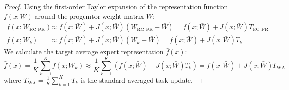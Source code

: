 \documentclass{article}
\theoremstyle{plain}
\theoremstyle{definition}
\theoremstyle{remark}
\begin{document}
\begin{proof}
Using the first-order Taylor expansion of the representation function $f(x; W)$ around the progenitor weight matrix $\bar{W}$:
\begin{align}
    f(x; W_{\text{RG-PR}}) &\approx f(x; \bar{W}) + J(x; \bar{W}) (W_{\text{RG-PR}} - \bar{W}) = f(x; \bar{W}) + J(x; \bar{W}) T_{\text{RG-PR}} \\
    f(x; W_k) &\approx f(x; \bar{W}) + J(x; \bar{W}) (W_k - \bar{W}) = f(x; \bar{W}) + J(x; \bar{W}) T_k
\end{align}
We calculate the target average expert representation $\bar{f}(x)$:
\begin{equation}
    \bar{f}(x) = \frac{1}{K} \sum_{k=1}^K f(x; W_k) \approx \frac{1}{K} \sum_{k=1}^K \left( f(x; \bar{W}) + J(x; \bar{W}) T_k \right) = f(x; \bar{W}) + J(x; \bar{W}) T_{\text{WA}}
\end{equation}
where $T_{\text{WA}} = \frac{1}{K} \sum_{k=1}^K T_k$ is the standard averaged task update.


\end{proof}
\end{document}
